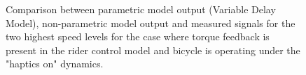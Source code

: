  \begin{figure}
    \centering
    \begin{subfigure}[b]{\textwidth}
        \centering
        \caption{}
        \label{fig:dm_fit3}
    \end{subfigure}
    \begin{subfigure}[b]{\textwidth}
        \centering
        \caption{}
        \label{fig:dm_fit4}
    \end{subfigure}
    
    \caption{Comparison between parametric model output (Variable Delay Model), non-parametric model output and measured signals for the two highest speed levels for the case where torque feedback is present in the rider control model and bicycle is operating under the "haptics on" dynamics.}
    \label{fig:dm_fitB}
 \end{figure}

